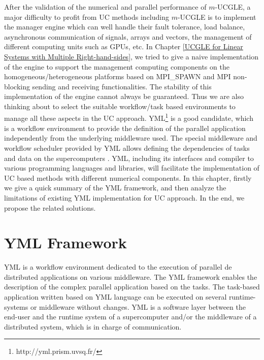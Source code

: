 \begin{displayquote}
	\textsf{After the validation of the numerical and parallel performance of $m$-UCGLE, a major difficulty to profit from UC methods including $m$-UCGLE is to implement the manager engine which can well handle their fault tolerance, load balance, asynchronous communication of signals, arrays and vectors, the management of different computing units such as GPUs, etc. In Chapter \ref{UCGLE for Linear Systems with Multiple Right-hand-sides}, we tried to give a naive implementation of the engine to support the management computing components on the homogeneous/heterogeneous platforms based on MPI\_SPAWN and MPI non-blocking sending and receiving functionalities. The stability of this implementation of the engine cannot always be guaranteed. Thus we are also thinking about to select the suitable workflow/task based environments to manage all these aspects in the UC approach. YML\footnote{http://yml.prism.uvsq.fr/} is a good candidate, which is a workflow environment to provide the definition of the parallel application independently from the underlying middleware used. The special middleware and workflow scheduler provided by YML allows defining the dependencies of tasks and data on the supercomputers \cite{delannoyyml}. YML, including its interfaces and compiler to various programming languages and libraries, will facilitate the implementation of UC based methods with different numerical components. In this chapter, firstly we give a quick summary of the YML framework, and then analyze the limitations of existing YML implementation for UC approach. In the end, we propose the related solutions.}
\end{displayquote}

\vspace{0.6in}


\section{YML Framework}

YML is a workflow environment dedicated to the execution of parallel de distributed applications on various middleware. The YML framework enables the description of the complex parallel application based on the tasks. The task-based application written based on YML language can be executed on several runtime-systems or middleware without changes. YML is a software layer between the end-user and the runtime system of a supercomputer and/or the middleware of a distributed system, which is in charge of communication. 

